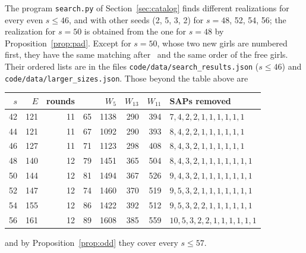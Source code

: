 The program \texttt{search.py} of Section~\ref{sec:catalog} finds different
realizations for every even $s\le46$, and with other seeds (2, 5, 3, 2)
for $s=48$, 52, 54, 56; the realization for $s=50$ is obtained from the one
for $s=48$ by Proposition~\ref{prop:pad}. Except for $s=50$, whose two new
girls are numbered first, they have the same matching after~ and the
same order of the free girls. Their ordered lists are in the files
\texttt{code/data/search\_results.json} ($s\le46$) and
\texttt{code/data/larger\_sizes.json}. Those beyond the table above are
\begin{center}\small
\setlength{\tabcolsep}{5pt}
\begin{tabular}{rrrrrrrl}
\toprule
$s$&$E$&rounds&\Hs1&$W_5$&$W_{13}$&$W_{11}$&SAPs removed\\
\midrule
42&121&11&65&1138&290&394&$7,4,2,2,1,1,1,1,1,1$\\
44&121&11&67&1092&290&393&$8,4,2,2,1,1,1,1,1,1$\\
46&127&11&71&1123&298&408&$8,4,3,2,1,1,1,1,1,1$\\
48&140&12&79&1451&365&504&$8,4,3,2,1,1,1,1,1,1,1$\\
50&144&12&81&1494&367&526&$9,4,3,2,1,1,1,1,1,1,1$\\
52&147&12&74&1460&370&519&$9,5,3,2,1,1,1,1,1,1,1$\\
54&155&12&86&1422&392&512&$9,5,3,2,2,1,1,1,1,1,1$\\
56&161&12&89&1608&385&559&$10,5,3,2,2,1,1,1,1,1,1$\\
\bottomrule
\end{tabular}
\end{center}
and by Proposition~\ref{prop:odd} they cover every $s\le57$.
